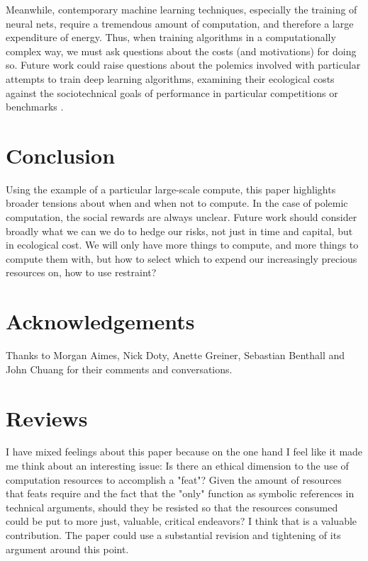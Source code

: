 \documentclass[sigconf]{acmart}
\begin{document}
Meanwhile, contemporary machine learning techniques, especially the training of neural nets, 
require a tremendous amount of computation, and therefore a large expenditure of energy.
Thus, when training algorithms in a computationally complex way,
we must ask questions about the costs (and motivations) for doing so.
Future work could raise questions about the polemics involved
with particular attempts to train deep learning algorithms,
examining their ecological costs against the sociotechnical goals 
of performance in particular competitions or benchmarks \cite{SixSilberman2015}.


\section{Conclusion}
\label{sec:org72096ad}

Using the example of a particular large-scale compute,
this paper highlights broader tensions about when and when not to compute.
In the case of polemic computation, the social rewards are always unclear.
Future work should consider broadly what we can we do to hedge our risks, 
not just in time and capital,
but in ecological cost.
We will only have more things to compute,
and more things to compute them with,
but how to select which to expend our increasingly precious resources on, 
how to use restraint?


\section{Acknowledgements}
\label{sec:org0ce3b81}
Thanks to Morgan Aimes, Nick Doty, Anette Greiner, Sebastian Benthall and John Chuang for their comments and conversations.




\section{Reviews}
\label{sec:org6daed1f}
I have mixed feelings about this paper because on the one hand I feel like it
made me think about an interesting issue:  Is there an ethical dimension to the
use of computation resources to accomplish a "feat"?  Given the amount of
resources that feats require and the fact that the "only" function as symbolic
references in technical arguments, should they be resisted so that the resources
consumed could be put to more just, valuable, critical endeavors?  I think that
is a valuable contribution.   The paper could use a substantial revision and
tightening of its argument around this point.
\end{document}
